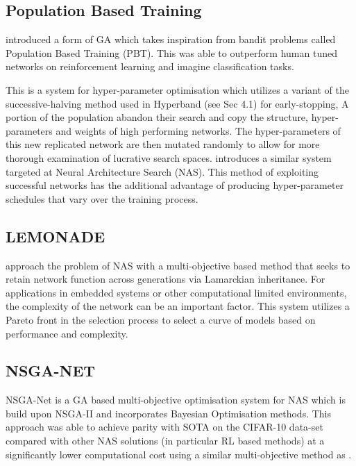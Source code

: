 \documentclass{article}
\begin{document}
	\subsection{Population Based Training}

		\cite{39} introduced a form of GA which takes inspiration from bandit problems called Population Based Training (PBT). This was able to outperform human tuned networks on reinforcement learning and imagine classification tasks.
		\par
		This is a system for hyper-parameter optimisation which utilizes a variant of the  successive-halving\cite{45} method used in Hyperband (see Sec 4.1) for early-stopping, A portion of the population abandon their search and copy the structure, hyper-parameters and weights of high performing networks. The hyper-parameters of this new replicated network are then mutated randomly to allow for more thorough examination of lucrative search spaces. \cite{13} introduces a similar system targeted at Neural Architecture Search (NAS).
		This method of exploiting successful networks has the additional advantage of producing hyper-parameter schedules that vary over the training process.


	\subsection{LEMONADE}

		\cite{13} approach the problem of NAS with a multi-objective based method that seeks to retain network function across generations via Lamarckian inheritance.
		 For applications in embedded systems or other computational limited environments, the complexity of the network can be an important factor. This system utilizes a Pareto front in the selection process to select a curve of models based on performance and complexity. 
	 

	\subsection{NSGA-NET}

		NSGA-Net \cite{5} is a GA based multi-objective optimisation system for NAS which is build upon NSGA-II\cite{42} and incorporates Bayesian Optimisation methods. This approach was able to achieve parity with SOTA on the CIFAR-10 data-set compared with other NAS solutions (in particular RL based methods) at a significantly lower computational cost using a similar multi-objective method as \cite{13}.
\end{document}

